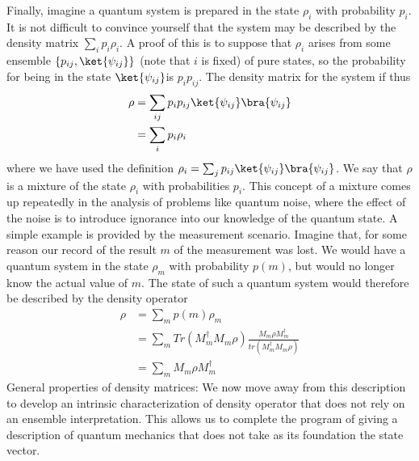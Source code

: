 \documentclass[12pt, oneside]{book}
\theoremstyle{definition}
\theoremstyle{definition}
\theoremstyle{remark}
\begin{document}
Finally, imagine a quantum system is prepared in the state $\rho_i$ with probability $p_i$. It is not difficult to convince yourself that the system may be described by the density matrix $\sum_ip_i\rho_i$. A proof of this is to suppose that $\rho_i$ arises from some ensemble $\{p_{ij},\ket{\psi_{ij}}\}$ (note that $i$ is fixed) of pure states, so the probability for being in the state $\ket{\psi_{ij}}$is $p_ip_{ij}$. The density matrix for the system if thus
\begin{align*}
\rho&=\sum_{ij} p_ip_{ij} \ket{\psi_{ij}}\bra{\psi_{ij}}\\
&=\sum_i p_i\rho_i
\end{align*}
where we have used the definition $\rho_i=\sum_jp_{ij}\ket{\psi_{ij}}\bra{\psi_{ij}}$. We say that $\rho$ is a mixture of the state $\rho_i$ with probabilities $p_i$. This concept of a mixture comes up repeatedly in the analysis of problems like quantum noise, where the effect of the noise is to introduce ignorance into our knowledge of the quantum state. A simple example is provided by the measurement scenario. Imagine that, for some reason our record of the result $m$ of the measurement was lost. We would have a quantum system in the state $\rho_m$ with probability $p(m)$, but would no longer know the actual value of $m$. The state of such a quantum system would therefore be described by the density operator
\begin{align*}
    \rho&=\sum_mp(m)\rho_m\\
    &=\sum_mTr(M_m^{\dagger}M_m\rho)\frac{M_m\rho M_m^{\dagger}}{tr(M_m^{\dagger}M_m\rho)}\\
    &=\sum_mM_m\rho M_m^{\dagger}
\end{align*}
General properties of density matrices:
We now move away from this description to develop an intrinsic characterization of density operator that does not rely on an ensemble interpretation. This allows us to complete the program of giving a description of quantum mechanics that does not take as its foundation the state vector.
\end{document}
